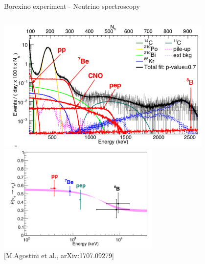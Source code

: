 \begin{frame}[t]{Borexino experiment - Neutrino spectroscopy}
\begin{columns}[T]
\begin{column}{0.53\textwidth}
\begin{center}
         \includegraphics[width=0.80\textwidth]{./images/3nu/solar/borexino_spectroscopy_1}\\
         \includegraphics[width=0.60\textwidth]{./images/3nu/solar/borexino_spectroscopy_2}\\
         {\scriptsize \color{blue}[M.Agostini et al., arXiv:1707.09279]}
        \end{center}
    \end{column}
  \end{columns}

\end{frame}

%
%
%


